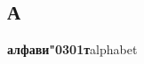 \documentclass[a5paper, 10pt]{article}
\title{\vskip -4em\bf\Huge\headingfont ле\ак ксика}
\date{}
\newcommand{\lexi}[2]{{\raggedleft\textbf{#1}\hfill{#2}\par}}
\newcommand{\ак}[0]{\char"0301} %
\begin{document}
\maketitle

\begin{multicols}{2}
  \subsection*{А}
  

  \lexi{алфави\ак т}{alphabet}

\end{multicols}
\end{document}
